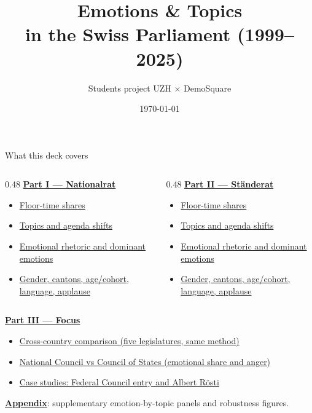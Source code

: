 \documentclass[xcolor={x11names,dvipsnames},10pt,aspectratio=169]{beamer}
\title[Swiss Parliament]{\textbf{Emotions \& Topics\\in the Swiss Parliament (1999--2025)}}
\author{Students project UZH $\times$ DemoSquare}
\date{\today}
\begin{document}
\begin{frame}[plain]
\titlepage
\end{frame}

\begin{frame}{What this deck covers}
\small
\begin{columns}[T]
\begin{column}{0.48\textwidth}
\hyperlink{part.NR}{\textbf{Part I --- Nationalrat}}\\[-0.1cm]
\begin{itemize}\setlength\itemsep{0.25em}
\item \hyperlink{part.NR}{Floor-time shares}
\item \hyperlink{part.NR}{Topics and agenda shifts}
\item \hyperlink{part.NR}{Emotional rhetoric and dominant emotions}
\item \hyperlink{part.NR}{Gender, cantons, age/cohort, language, applause}
\end{itemize}
\end{column}
\begin{column}{0.48\textwidth}
\hyperlink{part.SR}{\textbf{Part II --- Ständerat}}\\[-0.1cm]
\begin{itemize}\setlength\itemsep{0.25em}
\item \hyperlink{part.SR}{Floor-time shares}
\item \hyperlink{part.SR}{Topics and agenda shifts}
\item \hyperlink{part.SR}{Emotional rhetoric and dominant emotions}
\item \hyperlink{part.SR}{Gender, cantons, age/cohort, language, applause}
\end{itemize}
\end{column}
\end{columns}
\vspace{0.2cm}
\hyperlink{part.FOCUS}{\textbf{Part III --- Focus}}\\[-0.1cm]
\begin{itemize}\setlength\itemsep{0.15em}
\item \hyperlink{part.FOCUS.intl}{Cross-country comparison (five legislatures, same method)}
\item \hyperlink{part.FOCUS.chamber}{National Council vs Council of States (emotional share and anger)}
\item \hyperlink{part.FOCUS.roesti}{Case studies: Federal Council entry and Albert Rösti}
\end{itemize}
\vspace{0.15cm}
\hyperlink{part.APP}{\textbf{Appendix}}: supplementary emotion-by-topic panels and robustness figures.
\end{frame}
\end{document}

